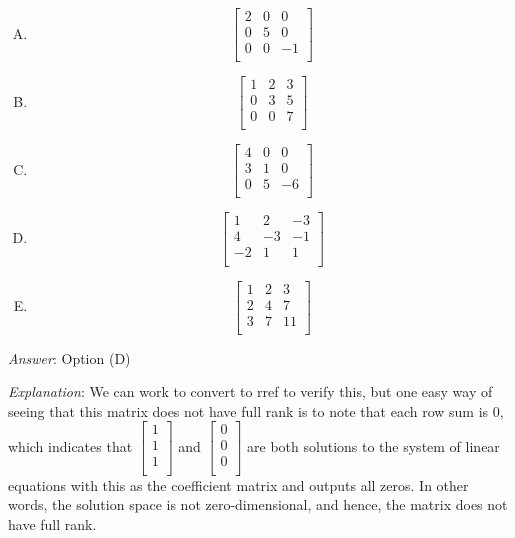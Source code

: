 \documentclass[10pt]{amsart}
\begin{document}
\begin{enumerate}
  \begin{enumerate}[(A)]
  \item $$\left[\begin{matrix} 2 & 0 & 0 \\ 0 & 5 & 0 \\ 0 & 0 & -1 \\\end{matrix}\right]$$
  \item $$\left[\begin{matrix} 1 & 2 & 3 \\ 0 & 3 & 5 \\ 0 & 0 & 7 \\\end{matrix} \right]$$
  \item $$\left[\begin{matrix} 4 & 0 & 0 \\ 3 & 1 & 0 \\ 0 & 5 & -6 \\\end{matrix}\right]$$
  \item $$\left[\begin{matrix} 1 & 2 & -3 \\ 4 & -3 & -1 \\ -2 & 1 & 1 \\\end{matrix}\right]$$
  \item $$\left[\begin{matrix} 1 & 2 & 3 \\ 2 & 4 & 7 \\ 3 & 7 & 11 \\\end{matrix}\right]$$
  \end{enumerate}

  {\em Answer}: Option (D)

  {\em Explanation}: We can work to convert to rref to verify this,
  but one easy way of seeing that this matrix does not have full rank
  is to note that each row sum is $0$, which indicates that
  $\left[\begin{matrix} 1 \\ 1 \\ 1 \\\end{matrix}\right]$ and
  $\left[\begin{matrix} 0 \\ 0 \\ 0 \\\end{matrix}\right]$ are both
  solutions to the system of linear equations with this as the
  coefficient matrix and outputs all zeros. In other words, the
  solution space is not zero-dimensional, and hence, the matrix does
  not have full rank.


\end{enumerate}
\end{document}
